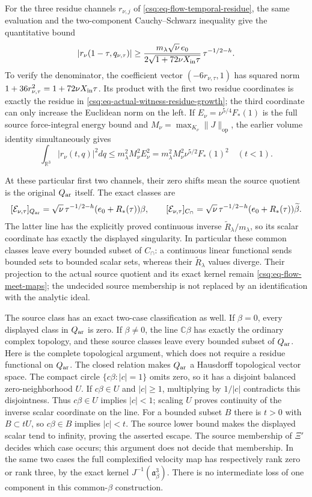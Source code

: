 For the three residue channels $r_{\nu,j}$ of
\eqref{csq:eq-flow-temporal-residue}, the same evaluation and the
two-component Cauchy--Schwarz inequality give the quantitative bound
\begin{equation}
 |r_\nu(1-\tau,q_{\nu,\tau})|
 \geq
 \frac{m_\lambda\sqrt\nu\,e_0}
             {2\sqrt{1+72\nu X_{\rm in}\tau}}\,
                   \tau^{-1/2-h}.
 \label{csq:eq-actual-witness-residue-vector-growth}
\end{equation}
To verify the denominator, the coefficient vector
$(-6r_{\nu,\tau},1)$ has squared norm
$1+36r_{\nu,\tau}^2=1+72\nu X_{\rm in}\tau$.
Its product with the first two residue coordinates is exactly
the residue in \eqref{csq:eq-actual-witness-residue-growth}; the
third coordinate can only increase the Euclidean norm on the left.
If $E_\nu=\nu^{5/4}F_*(1)$ is the full source force-integral energy
bound and $M_\nu=\max_{K_\nu}\|J\|_{\mathrm{op}}$, the earlier
volume identity simultaneously gives
\[
 \int_{\mathbb R^3}|r_\nu(t,q)|^2dq
 \leq m_\lambda^2M_\nu^2E_\nu^2
 =m_\lambda^2M_\nu^2\nu^{5/2}F_*(1)^2\quad(t<1).
\]

At these particular first two channels, their zero shifts mean the
source quotient is the original $Q_{\rm ar}$ itself. The exact classes are
\[
 [\mathcal E_{\nu,\tau}]_{Q_{\rm ar}}
 =\sqrt\nu\,\tau^{-1/2-h}(e_0+R_*(\tau))\beta,\qquad
 [\mathcal E_{\nu,\tau}]_{C_\cap}
 =\sqrt\nu\,\tau^{-1/2-h}(e_0+R_*(\tau))\widetilde\beta.
\]
The latter line has the explicitly proved continuous inverse
$\widetilde R_\lambda/m_\lambda$, so its scalar coordinate has
exactly the displayed singularity. In particular these common
classes leave every bounded subset of $C_\cap$: a continuous linear
functional sends bounded sets to bounded scalar sets, whereas their
$\widetilde R_\lambda$ values diverge. Their projection to the
actual source quotient and its exact kernel remain
\eqref{csq:eq-flow-meet-maps}; the undecided source membership is
not replaced by an identification with the analytic ideal.

The source class has an exact two-case classification as well.
If $\beta=0$, every displayed class in $Q_{\rm ar}$ is zero.
If $\beta\ne0$, the line $\mathbb C\beta$ has exactly the ordinary
complex topology, and these source classes leave every bounded
subset of $Q_{\rm ar}$. Here is the complete topological argument,
which does not require a residue functional on $Q_{\rm ar}$.
The closed relation makes $Q_{\rm ar}$ a Hausdorff topological vector
space. The compact circle $\{c\beta:|c|=1\}$ omits zero, so it
has a disjoint balanced zero-neighborhood $U$. If $c\beta\in U$
and $|c|\geq1$, multiplying by $1/|c|$ contradicts this
disjointness. Thus $c\beta\in U$ implies $|c|<1$; scaling $U$
proves continuity of the inverse scalar coordinate on the line.
For a bounded subset $B$ there is $t>0$ with $B\subset tU$,
so $c\beta\in B$ implies $|c|<t$. The source lower bound makes
the displayed scalar tend to infinity, proving the asserted escape.
The source membership of $\Xi'$ decides which case occurs; this
argument does not decide that membership. In the same two cases
the full complexified velocity map has respectively rank zero or
rank three, by the exact kernel $J^{-1}(\mathfrak a_\beta^3)$.
There is no intermediate loss of one component in this common-$\beta$
construction.

